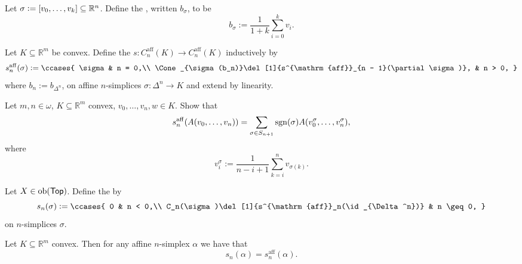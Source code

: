\begin{definition}[Barycenter]
	Let $\sigma := \sbr[0]{v_0,\dots,v_k} \subseteq \mathbb{R}^n$. Define the , written $b_\sigma$, to be
	\begin{equation*}
		b_\sigma := \frac{1}{1 + k}\sum_{i = 0}^k v_i.
	\end{equation*}
\end{definition}

\begin{definition}
	Let $K \subseteq \mathbb{R}^m$ be convex. Define the  $s : C_n^{\mathrm{aff}}(K) \to C^{\mathrm{aff}}_n(K)$ inductively by
	\begin{equation*}
		s^{\mathrm{aff}}_n(\sigma) := \ccases{
			\sigma & n = 0,\\
			\Cone_{\sigma(b_n)}\del[1]{s^{\mathrm{aff}}_{n - 1}(\partial\sigma)}, & n > 0,
		}
	\end{equation*}
	\noindent where $b_n := b_{\Delta^n}$, on affine $n$-simplices $\sigma : \Delta^n \to K$ and extend by linearity.
\end{definition}

\begin{exercise}
	\label{ex:formula_affine_barycentric_subdivision}
	Let $m,n \in \omega$, $K \subseteq \mathbb{R}^m$ convex, $v_0,\dots,v_n,w \in K$. Show that
	\begin{equation*}
		s^{\mathrm{aff}}_n(A(v_0,\dots,v_n)) = \sum_{\sigma \in S_{n + 1}} \operatorname{sgn}(\sigma) A(v_0^\sigma,\dots,v_n^\sigma),
	\end{equation*}
	\noindent where
	\begin{equation*}
		v_i^\sigma := \frac{1}{n - i + 1} \sum_{k = i}^n v_{\sigma(k)}.
	\end{equation*}
\end{exercise}

\begin{definition}
	Let $X \in \operatorname{ob}(\mathsf{Top})$. Define the  by
	\begin{equation*}
		s_n(\sigma) := \ccases{
			0 & n < 0,\\	
			C_n(\sigma)\del[1]{s^{\mathrm{aff}}_n(\id_{\Delta^n})} & n \geq 0,
		}
	\end{equation*}
	\noindent on $n$-simplices $\sigma$.
\end{definition}

\begin{lemma}
	\label{lem:s_aff_s}
	Let $K \subseteq \mathbb{R}^m$ convex. Then for any affine $n$-simplex $\alpha$ we have that
	\begin{equation*}
		s_n(\alpha) = s^{\mathrm{aff}}_n(\alpha).
	\end{equation*}
\end{lemma}

